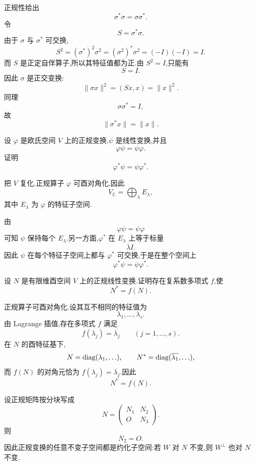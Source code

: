 \begin{solution}
正规性给出
\[
\sigma^*\sigma=\sigma\sigma^*.
\]
令
\[
S=\sigma^*\sigma.
\]
由于 $\sigma$ 与 $\sigma^*$ 可交换,
\[
S^2
=(\sigma^*)^2\sigma^2
=(\sigma^2)^*\sigma^2
=(-I)(-I)=I.
\]
而 $S$ 是正定自伴算子,所以其特征值都为正.由 $S^2=I$,只能有
\[
S=I.
\]
因此 $\sigma$ 是正交变换:
\[
\|\sigma x\|^2=(Sx,x)=\|x\|^2.
\]
同理
\[
\sigma\sigma^*=I,
\]
故
\[
\|\sigma^*x\|=\|x\|.
\]
\end{solution}


\begin{example}
设 $\varphi$ 是欧氏空间 $V$ 上的正规变换,$\psi$ 是线性变换,并且
\[
\varphi\psi=\psi\varphi.
\]
证明
\[
\varphi^*\psi=\psi\varphi^*.
\]
\end{example}
\exampleblank

\begin{solution}
把 $V$ 复化.正规算子 $\varphi$ 可酉对角化,因此
\[
V_{\mathbb{C}}
=
\bigoplus_{\lambda}E_\lambda,
\]
其中 $E_\lambda$ 为 $\varphi$ 的特征子空间.

由
\[
\varphi\psi=\psi\varphi
\]
可知 $\psi$ 保持每个 $E_\lambda$.另一方面,$\varphi^*$ 在 $E_\lambda$ 上等于标量
\[
\overline\lambda I.
\]
因此 $\psi$ 在每个特征子空间上都与 $\varphi^*$ 可交换,于是在整个空间上
\[
\boxed{\varphi^*\psi=\psi\varphi^*.}
\]
\end{solution}


\begin{example}
设 $N$ 是有限维酉空间 $V$ 上的正规线性变换.证明存在复系数多项式 $f$,使
\[
N^*=f(N).
\]
\end{example}
\exampleblank

\begin{solution}
正规算子可酉对角化.设其互不相同的特征值为
\[
\lambda_1,\ldots,\lambda_s.
\]
由 Lagrange 插值,存在多项式 $f$ 满足
\[
f(\lambda_j)=\overline{\lambda_j}
\qquad(j=1,\ldots,s).
\]
在 $N$ 的酉特征基下,
\[
N=\operatorname{diag}(\lambda_1,\ldots),
\qquad
N^*=\operatorname{diag}(\overline{\lambda_1},\ldots),
\]
而 $f(N)$ 的对角元恰为 $f(\lambda_j)=\overline{\lambda_j}$.因此
\[
\boxed{N^*=f(N)}.
\]
\end{solution}


\begin{proposition}[\markstar]
设正规矩阵按分块写成
\[
N=
\begin{pmatrix}
N_1&N_2\\
O&N_3
\end{pmatrix}.
\]
则
\[
N_2=O.
\]
因此正规变换的任意不变子空间都是约化子空间:若 $W$ 对 $N$ 不变,则 $W^\perp$ 也对 $N$ 不变.
\end{proposition}


